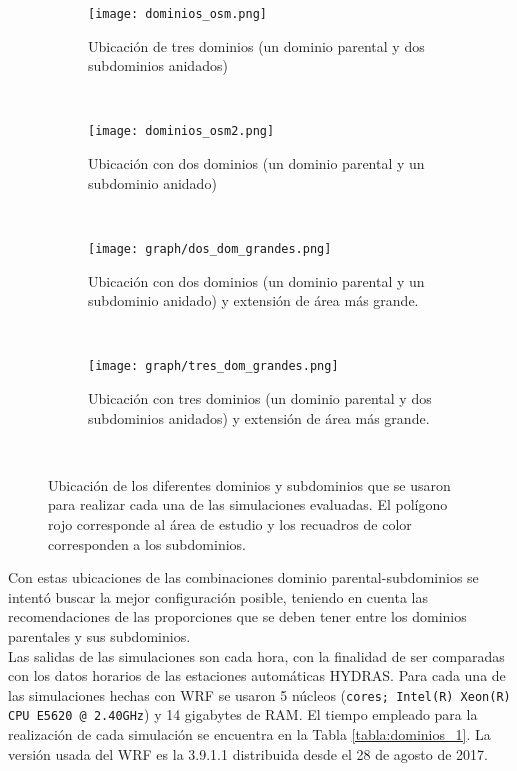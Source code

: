 \begin{figure}[H]
	\begin{center}
		\begin{subfigure}[normla]{0.4\textwidth}
		\caption{Ubicación de tres dominios (un dominio parental y dos subdominios anidados)}
	\texttt{[image: dominios\_osm.png]}
		\label{subfig:dom3}
		\end{subfigure}
		\vspace{1\baselineskip}
		~
		\begin{subfigure}[normla]{0.4\textwidth}
		\caption{Ubicación con dos dominios (un dominio parental y un subdominio anidado)}
	\texttt{[image: dominios\_osm2.png]}
		\label{subfig:dom2}
		\end{subfigure}
		~
    	\begin{subfigure}[normla]{0.4\textwidth}
		\caption{Ubicación con dos dominios (un dominio parental y un subdominio anidado) y extensión de área más grande.}
	\texttt{[image: graph/dos\_dom\_grandes.png]}
		\label{subfig:dom3.1}
		\end{subfigure}
		~
		\begin{subfigure}[normla]{0.4\textwidth}
		\caption{Ubicación con tres dominios (un dominio parental y dos subdominios anidados) y extensión de área más grande.}
	    \texttt{[image: graph/tres\_dom\_grandes.png]}
		\label{subfig:dom4}
		\end{subfigure}      
		~	

	
	

	\end{center}
	\caption{Ubicación de los diferentes dominios y subdominios que se usaron para realizar cada una de las simulaciones evaluadas. El  polígono rojo corresponde al área de estudio y los recuadros de color corresponden a  los subdominios.}
	\label{gra:areas}	
\end{figure}

Con estas ubicaciones de las combinaciones dominio parental-subdominios se intentó buscar la mejor configuración posible, teniendo en cuenta las recomendaciones de las proporciones que se deben tener entre los dominios parentales y sus subdominios.\\


Las salidas de las simulaciones son cada hora, con la finalidad de ser comparadas con los datos horarios de las estaciones automáticas HYDRAS. Para cada una de las simulaciones hechas con WRF se usaron 5 núcleos (\texttt{cores; Intel(R) Xeon(R) CPU E5620 @ 2.40GHz}) y 14 gigabytes de RAM. El tiempo empleado para la realización de cada simulación se encuentra en la Tabla \ref{tabla:dominios_1}. La versión usada del WRF es la 3.9.1.1 distribuida desde el 28 de agosto de 2017.

